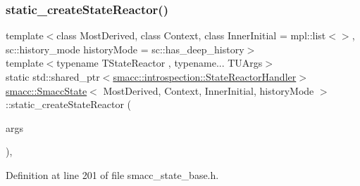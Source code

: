 \subsubsection{\texorpdfstring{static\+\_\+create\+State\+Reactor()}{static\_createStateReactor()}}
{\footnotesize\ttfamily template$<$class Most\+Derived, class Context, class Inner\+Initial = mpl\+::list$<$$>$, sc\+::history\+\_\+mode history\+Mode = sc\+::has\+\_\+deep\+\_\+history$>$ \\
template$<$typename T\+State\+Reactor , typename... T\+U\+Args$>$ \\
static std\+::shared\+\_\+ptr$<$\hyperlink{classsmacc_1_1introspection_1_1StateReactorHandler}{smacc\+::introspection\+::\+State\+Reactor\+Handler}$>$ \hyperlink{classsmacc_1_1SmaccState}{smacc\+::\+Smacc\+State}$<$ Most\+Derived, Context, Inner\+Initial, history\+Mode $>$\+::static\+\_\+create\+State\+Reactor (\begin{DoxyParamCaption}\item[{T\+U\+Args...}]{args }\end{DoxyParamCaption})\hspace{0.3cm}{\ttfamily [inline]}, {\ttfamily [static]}}



Definition at line 201 of file smacc\+\_\+state\+\_\+base.\+h.


